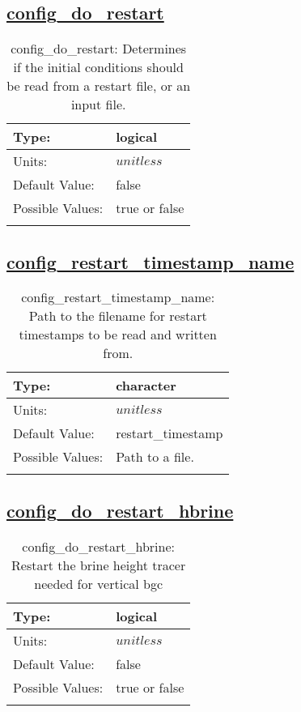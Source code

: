 \subsection[config\_do\_restart]{\hyperref[sec:nm_tab_restart]{config\_do\_restart}}
\label{subsec:nm_sec_config_do_restart}
\begin{center}
\begin{longtable}{| p{2.0in} || p{4.0in} |}
    \hline
    Type: & logical \\
    \hline
    Units: & $unitless$ \\
    \hline
    Default Value: & false \\
    \hline
    Possible Values: & true or false \\
    \hline
    \caption{config\_do\_restart: Determines if the initial conditions should be read from a restart file, or an input file.}
\end{longtable}
\end{center}
\subsection[config\_restart\_timestamp\_name]{\hyperref[sec:nm_tab_restart]{config\_restart\_timestamp\_name}}
\label{subsec:nm_sec_config_restart_timestamp_name}
\begin{center}
\begin{longtable}{| p{2.0in} || p{4.0in} |}
    \hline
    Type: & character \\
    \hline
    Units: & $unitless$ \\
    \hline
    Default Value: & restart\_timestamp \\
    \hline
    Possible Values: & Path to a file. \\
    \hline
    \caption{config\_restart\_timestamp\_name: Path to the filename for restart timestamps to be read and written from.}
\end{longtable}
\end{center}
\subsection[config\_do\_restart\_hbrine]{\hyperref[sec:nm_tab_restart]{config\_do\_restart\_hbrine}}
\label{subsec:nm_sec_config_do_restart_hbrine}
\begin{center}
\begin{longtable}{| p{2.0in} || p{4.0in} |}
    \hline
    Type: & logical \\
    \hline
    Units: & $unitless$ \\
    \hline
    Default Value: & false \\
    \hline
    Possible Values: & true or false \\
    \hline
    \caption{config\_do\_restart\_hbrine: Restart the brine height tracer needed for vertical bgc}
\end{longtable}
\end{center}
